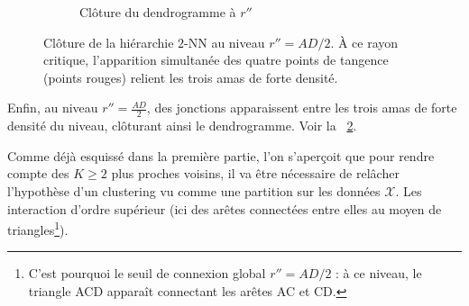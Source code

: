 \begin{figure}[htbp]
\begin{subfigure}[b]{0.51\textwidth}
\begin{tikzpicture}[scale=0.65]
        \end{tikzpicture}
        \caption{Clôture du dendrogramme à $r''$}
        \label{fig:fusion_rsecond}
    \end{subfigure}
    
    \caption{Clôture de la hiérarchie $2$-NN au niveau $r'' = AD/2$. À ce rayon critique, l'apparition simultanée des quatre points de tangence (points rouges) relient les trois amas de forte densité.}
    \label{fig:complexe_rsecond}
\end{figure}

Enfin, au niveau $r''= \frac{AD}{2}$, des jonctions apparaissent entre les trois amas de forte densité du niveau, clôturant ainsi le dendrogramme. Voir la \Fig~\ref{fig:complexe_rsecond}.


Comme déjà esquissé dans la première partie, l'on s'aperçoit que pour rendre compte des $K \ge 2$ plus proches voisins, il va être nécessaire de relâcher l'hypothèse d'un clustering vu comme une partition sur les données $\mathcal X$.
Les interaction d'ordre supérieur (ici des arêtes connectées entre elles au moyen de triangles\footnote{C'est pourquoi le seuil de connexion global $r'' = AD/2$ : à ce niveau, le triangle ACD apparaît connectant les arêtes AC et CD.}).


